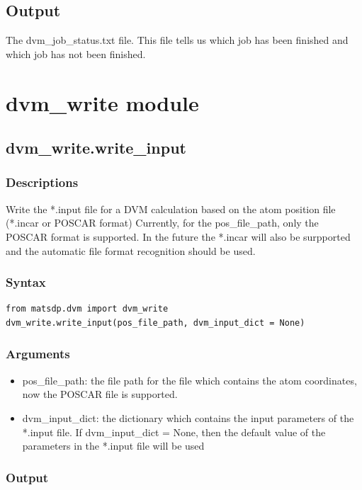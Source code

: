 \documentclass[12pt]{book}
\begin{document}
\subsection{Output}
The dvm\_job\_status.txt file. This file tells us which job has been finished and which job has not been finished.

\section{dvm\_write module}

\subsection{dvm\_write.write\_input}
\subsubsection{Descriptions}
Write the *.input file for a DVM calculation based on the atom position file (*.incar or POSCAR format)
Currently, for the pos\_file\_path, only the POSCAR format is supported. In the future the *.incar will also be surpported and the automatic file format recognition should be used.

\subsubsection{Syntax}
\begin{lstlisting}
from matsdp.dvm import dvm_write
dvm_write.write_input(pos_file_path, dvm_input_dict = None)
\end{lstlisting}

\subsubsection{Arguments}

\begin{itemize}
\item pos\_file\_path: the file path for the file which contains the atom coordinates, now the POSCAR file is supported.
\item dvm\_input\_dict: the dictionary which contains the input parameters of the *.input file. If dvm\_input\_dict = None, then the default value of the parameters in the *.input file will be used
\end{itemize}


\subsubsection{Output}
\end{document}
